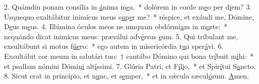 2. Quámdiu ponam consília in \uline{á}nima m\uline{e}a,~* dolórem in corde m\uline{e}o per d\uline{i}em?
3. Usquequo exaltábitur inimícus meus s\uline{u}p\uline{e}r me?~* réspice, et exáudi me, Dómine, D\uline{e}us m\uline{e}us.
4. Illúmina óculos meos ne umquam obdórmi\uline{a}m in m\uline{o}rte:~* nequándo dicat inimícus meus: præválui adv\uline{é}rsus \uline{e}um.
5. Qui tríbulant me, exsultábunt si motus f\uline{ú}\uline{e}ro:~* ego autem in misericórdia t\uline{u}a sper\uline{á}vi.
6. Exsultábit cor meum in salutári tuo:~† cantábo Dómino qui bona tr\uline{í}buit m\uline{i}hi:~* et psallam nómini Dómin\uline{i} alt\uline{í}ssimi.
7. Glória Patri, et F\uline{í}l\uline{i}o,~* et Spir\uline{í}tui S\uline{a}ncto.
8. Sicut erat in princípio, et n\uline{u}nc, et s\uline{e}mper,~* et in sǽcula sæcul\uline{ó}rum. \uline{A}men.
